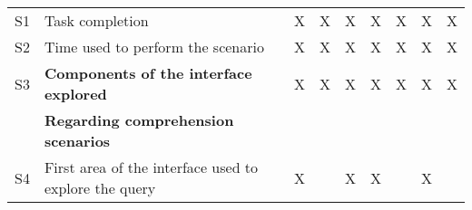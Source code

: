 \begin{longtable}{@{}lm{7cm}ccccccc@{}}
    S1          & Task completion                                                                                                                                         & X                                              & X                                              & X                                              & X                                              & X                                              & X                                              & X                                              \\
    S2          & Time used to perform the scenario                                                                                                                       & X                                              & X                                              & X                                              & X                                              & X                                              & X                                              & X                                              \\
    S3 & \textbf{Components of the interface explored}                                                                                                           & X                                              & X                                              & X                                              & X                                              & X                                              & X                                              & X                                              \\* \midrule
                & \textbf{Regarding comprehension scenarios}                                                                                                              &                                                &                                                &                                                &                                                &                                                &                                                &                                                \\* \midrule
    S4          & First area of the interface used to explore the query                                                                                                   & X                                              &                                                & X                                              & X                                              &                                                & X                                              &                                                \\

\end{longtable}

